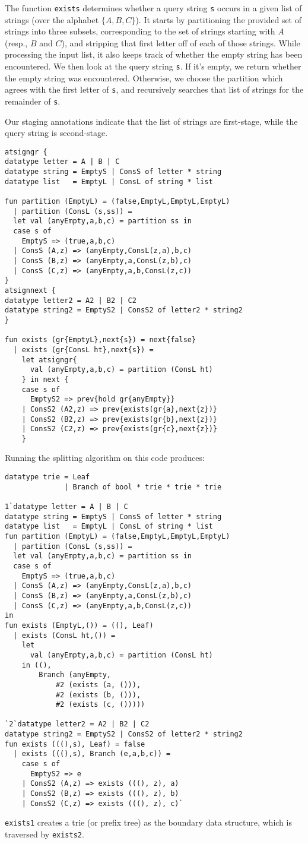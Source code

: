The function {\tt exists} determines whether a query string \texttt{s} occurs in
a given list of strings (over the alphabet $\{A,B,C\}$). It starts by
partitioning the provided set of strings into three subsets, corresponding to
the set of strings starting with $A$ (resp., $B$ and $C$), and stripping that
first letter off of each of those strings. While processing the input list, it
also keeps track of whether the empty string has been encountered.
%
We then look at the query string \texttt{s}. If it's empty, we return whether
the empty string was encountered. Otherwise, we choose the partition which
agrees with the first letter of \texttt{s}, and recursively searches that list
of strings for the remainder of \texttt{s}.

Our staging annotations indicate that the list of strings are first-stage, while
the query string is second-stage.
\begin{lstlisting} 
atsigngr { 
datatype letter = A | B | C 
datatype string = EmptyS | ConsS of letter * string
datatype list   = EmptyL | ConsL of string * list

fun partition (EmptyL) = (false,EmptyL,EmptyL,EmptyL) 
  | partition (ConsL (s,ss)) = 
  let val (anyEmpty,a,b,c) = partition ss in 
  case s of 
    EmptyS => (true,a,b,c) 
  | ConsS (A,z) => (anyEmpty,ConsL(z,a),b,c) 
  | ConsS (B,z) => (anyEmpty,a,ConsL(z,b),c) 
  | ConsS (C,z) => (anyEmpty,a,b,ConsL(z,c)) 
}
atsignnext { 
datatype letter2 = A2 | B2 | C2
datatype string2 = EmptyS2 | ConsS2 of letter2 * string2
}

fun exists (gr{EmptyL},next{s}) = next{false} 
  | exists (gr{ConsL ht},next{s}) = 
	let atsigngr{
	  val (anyEmpty,a,b,c) = partition (ConsL ht)
	} in next { 
	case s of 
	  EmptyS2 => prev{hold gr{anyEmpty}} 
	| ConsS2 (A2,z) => prev{exists(gr{a},next{z})} 
	| ConsS2 (B2,z) => prev{exists(gr{b},next{z})}
	| ConsS2 (C2,z) => prev{exists(gr{c},next{z})}  
	} 
\end{lstlisting}
Running the splitting algorithm on this code produces:
\begin{lstlisting} 
datatype trie = Leaf 
			  | Branch of bool * trie * trie * trie

1`datatype letter = A | B | C 
datatype string = EmptyS | ConsS of letter * string
datatype list   = EmptyL | ConsL of string * list
fun partition (EmptyL) = (false,EmptyL,EmptyL,EmptyL) 
  | partition (ConsL (s,ss)) = 
  let val (anyEmpty,a,b,c) = partition ss in 
  case s of 
    EmptyS => (true,a,b,c) 
  | ConsS (A,z) => (anyEmpty,ConsL(z,a),b,c) 
  | ConsS (B,z) => (anyEmpty,a,ConsL(z,b),c) 
  | ConsS (C,z) => (anyEmpty,a,b,ConsL(z,c)) 
in
fun exists (EmptyL,()) = ((), Leaf)
  | exists (ConsL ht,()) =
	let 
	  val (anyEmpty,a,b,c) = partition (ConsL ht) 
	in ((), 
		Branch (anyEmpty, 
			#2 (exists (a, ())), 
			#2 (exists (b, ())), 
			#2 (exists (c, ()))))

`2`datatype letter2 = A2 | B2 | C2
datatype string2 = EmptyS2 | ConsS2 of letter2 * string2
fun exists (((),s), Leaf) = false
  | exists (((),s), Branch (e,a,b,c)) = 
    case s of
	  EmptyS2 => e
	| ConsS2 (A,z) => exists (((), z), a)
	| ConsS2 (B,z) => exists (((), z), b)
	| ConsS2 (C,z) => exists (((), z), c)`

\end{lstlisting}

\texttt{exists1} creates a trie (or prefix tree) as the boundary data structure,
which is traversed by \texttt{exists2}.

